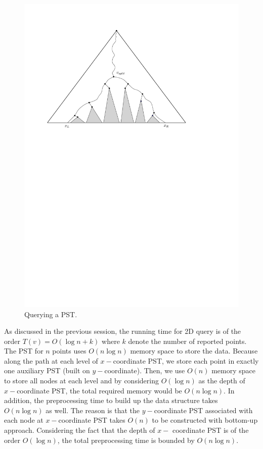 \begin{figure}[h!]
\begin{center}
  \includegraphics[scale = .5]{ipe/RQ3.pdf}
  \vspace{-0.1in}
  \caption{Querying a PST.}
  \label{fig:PST3}
\end{center}
\end{figure}

As discussed in the previous session, the running time for 2D query is of the order $T(v) = O(\log n+k)$ where $k$ denote the number of reported points. The PST for $n$ points uses $O(n \log n)$ memory space to store the data. Because along the path at each level of $x-$coordinate PST, we store each point in exactly one auxiliary PST (built on $y-$coordinate). Then, we use $O(n)$ memory space to store all nodes at each level and by considering $O(\log n)$ as the depth of $x-$coordinate PST, the total required memory would be $O(n\log n)$. In addition, the preprocessing time to build up the data structure takes $O(n \log n)$ as well. The reason is that the $y-$coordinate PST associated with each node at $x-$coordinate PST takes $O(n)$ to be constructed with bottom-up approach. Considering the fact that the depth of $x-$ coordinate PST is of the order $O(\log n)$, the total preprocessing time is bounded by $O(n\log n)$.